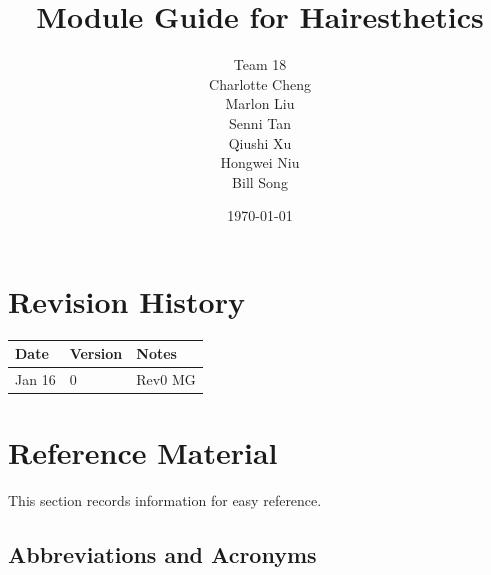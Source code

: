 \documentclass[12pt, titlepage]{article}
\begin{document}
\title{Module Guide for Hairesthetics}

\author{Team 18 \\ Charlotte Cheng
        \\ Marlon Liu
        \\ Senni Tan
        \\ Qiushi Xu
        \\ Hongwei Niu
        \\ Bill Song
}
\date{\today}

\maketitle


\section{Revision History}

\begin{tabularx}{\textwidth}{p{3cm}p{2cm}X}
\toprule {\bf Date} & {\bf Version} & {\bf Notes}\\
\midrule
Jan 16 & 0 & Rev0 MG\\
\bottomrule
\end{tabularx}

\newpage

\section{Reference Material}

This section records information for easy reference.

\subsection{Abbreviations and Acronyms}
\end{document}
